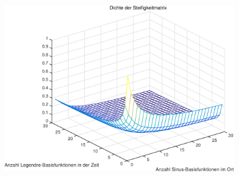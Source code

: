 \begin{figure}[tb]
    \begin{center}
        \includegraphics[width=0.9\textwidth]{figures/oned/density.pdf}
    \end{center}
\end{figure}

